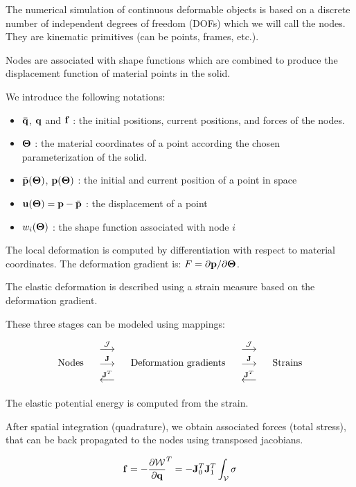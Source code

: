 The numerical simulation of continuous deformable objects is based on a discrete number of independent degrees of freedom (DOFs) which we will call the nodes. They are kinematic primitives (can be points, frames, etc.).

Nodes are associated with shape functions which are combined to produce the displacement function of material points in the solid.

We introduce the following notations:
\begin{itemize}
 \item $\mathbf{{\bar{q}}}$, $\mathbf{{q}}$ and $\mathbf{{f}}$ : the initial positions, current positions, and forces of the nodes.
 \item $\mathbf{{\Theta}}$ : the material coordinates of a point according the chosen parameterization of the solid.
 \item $\bar{\mathbf{{p}}}(\mathbf{{\Theta}})$, $\mathbf{{p}} (\mathbf{{\Theta}})$ : the initial and current position of a point in space
 \item $\mathbf{{u}} (\mathbf{{\Theta}}) =\mathbf{{p}}-\bar{\mathbf{{p}}}$ : the displacement of a point
 \item $w_i(\mathbf{{\Theta}})$ : the shape function associated with node $i$
\end{itemize}

The local deformation is computed by differentiation with respect to material coordinates. The deformation gradient is: $F = \partial \mathbf{{p}} / \partial \mathbf{{\Theta}}$.

The elastic deformation is described using a strain measure based on the deformation gradient. 

These three stages can be modeled using \sofa{} mappings:

\begin{equation}
\left. \begin{array}{ccccc}
\mbox{Nodes}  & \left. \begin{array}{c} \stackrel{\mathbf{\mathcal{J}}}{\longrightarrow} \\ \stackrel{\mathbf{{J}}}{\longrightarrow} \\ \stackrel{\mathbf{{J}}^T}{\longleftarrow} \end{array}\right. &   \mbox{Deformation gradients} & \left. \begin{array}{c} \stackrel{\mathbf{\mathcal{J}}}{\longrightarrow} \\ \stackrel{\mathbf{{J}}}{\longrightarrow} \\ \stackrel{\mathbf{{J}}^T}{\longleftarrow} \end{array}\right. &  \mbox{Strains}
\end{array}\right. 
\end{equation}

The elastic potential energy is computed from the strain. 

After spatial integration (quadrature), we obtain associated forces (total stress), that can be back propagated to the nodes using transposed jacobians.

\begin{equation}\label{eq:f}
 \mathbf{{\mathbf{{f}}}} = - \frac{\partial \mathcal{W}}{\partial \mathbf{{q}}}^T =  - \mathbf{{J}}^T_0\mathbf{{J}}^T_1 \int_{\mathcal{V}} \sigma
\end{equation}

